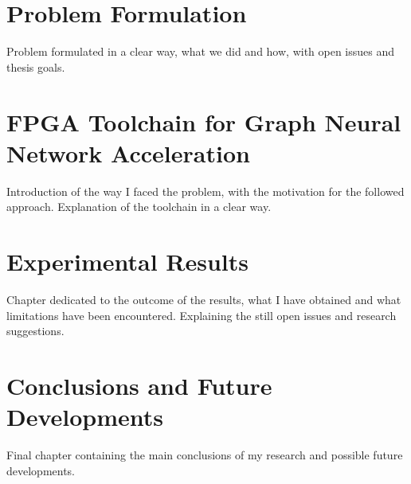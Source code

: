 \documentclass{Configuration_Files/PoliMi3i_thesis}
\begin{document}


    \chapter{Problem Formulation}
    \label{ch:chapter_four}%

    Problem formulated in a clear way, what we did and how, with open issues and thesis goals.



    \chapter{FPGA Toolchain for Graph Neural Network Acceleration}
    \label{ch:chapter_five}%

    Introduction of the way I faced the problem, with the motivation for the followed approach.
    Explanation of the toolchain in a clear way.



    \chapter{Experimental Results}
    \label{ch:chapter_six}%

    Chapter dedicated to the outcome of the results, what I have obtained and what limitations have been encountered.
    Explaining the still open issues and research suggestions.




    \chapter{Conclusions and Future Developments}
    \label{ch:conclusions}%
    Final chapter containing the main conclusions of my research
    and possible future developments.
\end{document}
